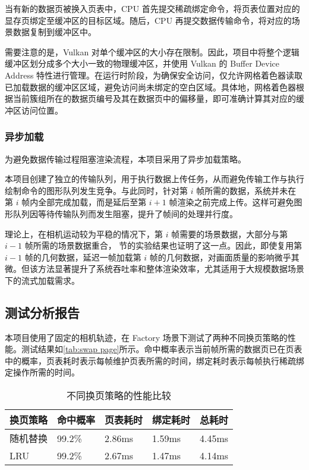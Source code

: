 当有新的数据页被换入页表中，CPU 首先提交稀疏绑定命令，将页表位置对应的显存页绑定至缓冲区的目标区域。随后，CPU 再提交数据传输命令，将对应的场景数据复制到缓冲区中。

需要注意的是，Vulkan 对单个缓冲区的大小存在限制。因此，项目中将整个逻辑缓冲区划分成多个大小一致的物理缓冲区，并使用 Vulkan 的 Buffer Device Address 特性进行管理\cite{BDA}。在运行时阶段，为确保安全访问，仅允许网格着色器读取已加载数据的缓冲区区域，避免访问尚未绑定的空白区域。具体地，网格着色器根据当前簇组所在的数据页编号及其在数据页中的偏移量，即可准确计算其对应的缓冲区访问位置。

\subsubsection{异步加载}

为避免数据传输过程阻塞渲染流程，本项目采用了异步加载策略\cite{UnityStreaming}。

本项目创建了独立的传输队列，用于执行数据上传任务，从而避免传输工作与执行绘制命令的图形队列发生竞争。与此同时，针对第 $i$ 帧所需的数据，系统并未在第 $i$ 帧内全部完成加载，而是延后至第 $i{+}1$ 帧渲染之前完成上传。这样可避免图形队列因等待传输队列而发生阻塞，提升了帧间的处理并行度。

理论上，在相机运动较为平稳的情况下，第 $i$ 帧需要的场景数据，大部分与第 $i{-}1$ 帧所需的场景数据重合，\label{subsec:streaming test} 节的实验结果也证明了这一点。因此，即使复用第 $i{-}1$ 帧的几何数据，延迟一帧加载第 $i$ 帧的几何数据，对画面质量的影响微乎其微。但该方法显著提升了系统吞吐率和整体渲染效率，尤其适用于大规模数据场景下的流式加载需求。

\subsection{测试分析报告} \label{subsec:streaming test}

本项目使用了固定的相机轨迹，在 Factory 场景下测试了两种不同换页策略的性能。测试结果如\autoref{tab:swap page}所示。命中概率表示当前帧所需的数据页已在页表中的概率，页表耗时表示每帧维护页表所需的时间，绑定耗时表示每帧执行稀疏绑定操作所需的时间。

\begin{table}[H]
    \caption{\label{tab:swap page}不同换页策略的性能比较}
    \begin{tabularx}{\linewidth}{|X<{\centering}|X<{\centering}|X<{\centering}|X<{\centering}|X<{\centering}|}
        \hline
        换页策略 & 命中概率 & 页表耗时 & 绑定耗时 & 总耗时 \\ \hline
        随机替换 & 99.2\% & 2.86ms & 1.59ms & 4.45ms \\ \hline
        LRU & 99.2\% & 2.67ms & 1.47ms & 4.14ms \\ \hline
    \end{tabularx}
\end{table}

